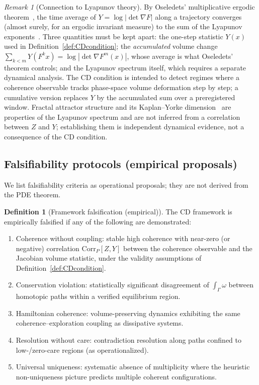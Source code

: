 \documentclass[11pt]{article}
\theoremstyle{plain}
\theoremstyle{definition}
\newtheorem{definition}[theorem]{Definition}
\theoremstyle{remark}
\newtheorem{remark}[theorem]{Remark}
\newcommand{\abs}[1]{\left\lvert #1\right\rvert}
\begin{document}
\begin{remark}[Connection to Lyapunov theory]
By Oseledets' multiplicative ergodic theorem~\cite{Oseledets1968}, the time average of \(Y=\log\abs{\det \nabla F}\) along a trajectory converges (almost surely, for an ergodic invariant measure) to the sum of the Lyapunov exponents~\cite{Lyapunov1892,Pesin1977}. Three quantities must be kept apart: the one-step statistic \(Y(x)\) used in Definition~\ref{def:CDcondition}; the \emph{accumulated} volume change \(\sum_{k<m}Y(F^k x)=\log\abs{\det\nabla F^m(x)}\), whose average is what Oseledets' theorem controls; and the Lyapunov spectrum itself, which requires a separate dynamical analysis. The CD condition is intended to detect regimes where a coherence observable tracks phase-space volume deformation step by step; a cumulative version replaces \(Y\) by the accumulated sum over a preregistered window. Fractal attractor structure and its Kaplan--Yorke dimension~\cite{KaplanYorke1979} are properties of the Lyapunov spectrum and are not inferred from a correlation between \(Z\) and \(Y\); establishing them is independent dynamical evidence, not a consequence of the CD condition.
\end{remark}

\subsection{Falsifiability protocols (empirical proposals)}
We list falsifiability criteria as operational proposals; they are not derived from the PDE theorem.

\begin{definition}[Framework falsification (empirical)]
The CD framework is empirically falsified if any of the following are demonstrated:
\begin{enumerate}[label=(F\arabic*),leftmargin=2.5em]
\item Coherence without coupling: stable high coherence with near-zero (or negative) correlation \(\mathrm{Corr}_P[Z,Y]\) between the coherence observable and the Jacobian volume statistic, under the validity assumptions of Definition~\ref{def:CDcondition}.
\item Conservation violation: statistically significant disagreement of \(\int_\Gamma\omega\) between homotopic paths within a verified equilibrium region.
\item Hamiltonian coherence: volume-preserving dynamics exhibiting the same coherence--exploration coupling as dissipative systems.
\item Resolution without care: contradiction resolution along paths confined to low-/zero-care regions (as operationalized).
\item Universal uniqueness: systematic absence of multiplicity where the heuristic non-uniqueness picture predicts multiple coherent configurations.
\end{enumerate}
\end{definition}
\end{document}
